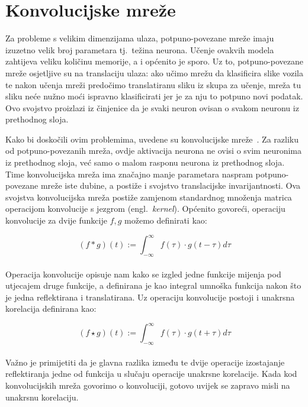 \documentclass[times, utf8, zavrsni, numeric]{fer}
\begin{document}
\section{Konvolucijske mreže}
Za probleme s velikim dimenzijama ulaza, potpuno-povezane mreže imaju izuzetno velik broj parametara tj.\ težina neurona. 
Učenje ovakvih modela zahtijeva veliku količinu memorije, a i općenito je sporo. 
Uz to, potpuno-povezane mreže osjetljive su na translaciju ulaza: ako učimo mrežu da klasificira slike vozila te nakon učenja mreži predočimo translatiranu sliku iz skupa za učenje, mreža tu sliku neće nužno moći ispravno klasificirati jer je za nju to potpuno novi podatak.
Ovo svojstvo proizlazi iz činjenice da je svaki neuron ovisan o svakom neuronu iz prethodnog sloja.

Kako bi doskočili ovim problemima, uvedene su konvolucijske mreže~\cite{o2015introduction}. 
Za razliku od potpuno-povezanih mreža, ovdje aktivacija neurona ne ovisi o svim neuronima iz prethodnog sloja, već samo o malom rasponu neurona iz prethodnog sloja. 
Time konvolucijska mreža ima značajno manje parametara naspram potpuno-povezane mreže iste dubine, a postiže i svojstvo translacijske invarijantnosti.
Ova svojstva konvolucijska mreža postiže zamjenom standardnog množenja matrica operacijom konvolucije s jezgrom (engl.\ \textit{kernel}). 
Općenito govoreći, operaciju konvolucije za dvije funkcije $f, g$ možemo definirati kao:

\begin{equation}
    (f * g)(t) := \int_{-\infty}^{\infty}f(\tau) \cdot g(t-\tau)d\tau
    \label{eq:convolution}
\end{equation}
\\
Operacija konvolucije opisuje nam kako se izgled jedne funkcije mijenja pod utjecajem druge funkcije, 
a definirana je kao integral umnoška funkcija nakon što je jedna reflektirana i translatirana. 
Uz operaciju konvolucije postoji i unakrsna korelacija definirana kao:

\begin{equation}
    (f \star g)(t) := \int_{-\infty}^{\infty}f(\tau) \cdot g(t+\tau)d\tau
    \label{eq:correlation}
\end{equation}
\\
Važno je primijetiti da je glavna razlika između te dvije operacije izostajanje reflektiranja jedne od funkcija u slučaju operacije unakrsne korelacije. 
Kada kod konvolucijskih mreža govorimo o konvoluciji, gotovo uvijek se zapravo misli na unakrsnu korelaciju.
\end{document}
